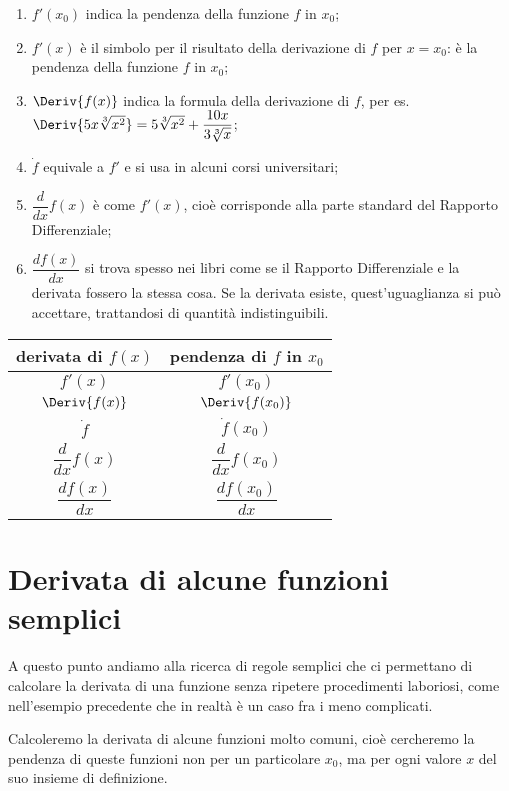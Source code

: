 \begin{enumerate}[noitemsep]
 \item \(f'(x_0)\) indica la pendenza della funzione \(f\) in \(x_0\);
 \item \(f'(x)\) è il simbolo per il risultato della derivazione di \(f\) 
 per \(x= x_0\): è la pendenza della funzione \(f\) in \(x_0\);
 \item \(\Deriv{f(x)}\) indica la formula della derivazione di 
\(f\),  per es. 
\(\Deriv{5x\sqrt[3]{x^2}}=5\sqrt[3]{x^2}+\dfrac{10x}
  {3\sqrt[3]{x}}\);
 \item \(\dot{f}\) equivale a \(f'\) e si usa in alcuni corsi universitari;
 \item \(\dfrac{d}{dx}f(x)\) è come \(f'(x)\), cioè corrisponde alla parte 
standard del Rapporto Differenziale;
 \item \(\dfrac{df(x)}{dx}\) si trova spesso nei libri come se il Rapporto
 Differenziale e la derivata fossero la stessa cosa. Se la derivata 
esiste, quest'uguaglianza si può accettare, trattandosi di quantità 
indistinguibili. 
\end{enumerate}

\begin{center}
\begin{tabular}{cc}
derivata di \(f(x)\) & pendenza di \(f\) in \(x_0\) \\
\midrule
\(f'(x)\) &  \(f'(x_0)\)\\[.3em]
\(\Deriv{f(x)}\) & \(\Deriv{f(x_0)}\)\\[.3em]
\(\dot{f}\) & \(\dot{f}(x_0)\)\\[.3em]
\(\dfrac{d}{dx}f(x)\) & \(\dfrac{d}{dx}f(x_0)\) \\[1em]
\(\dfrac{df(x)}{dx}\) & \(\dfrac{df(x_0)}{dx}\) \\[.5em]
\bottomrule
\end{tabular}
\end{center}

\section{Derivata di alcune funzioni semplici}
\label{sec:differenziazione_derivatafsemplici}
A questo punto andiamo alla ricerca di regole semplici che ci permettano 
di calcolare la derivata di una funzione senza ripetere procedimenti 
laboriosi, come nell'esempio precedente che in realtà è un caso fra i 
meno complicati.

Calcoleremo la derivata di alcune funzioni molto comuni, cioè cercheremo 
la pendenza di queste funzioni non per un particolare \(x_0\), ma per ogni 
valore \(x\) del suo insieme di definizione.


